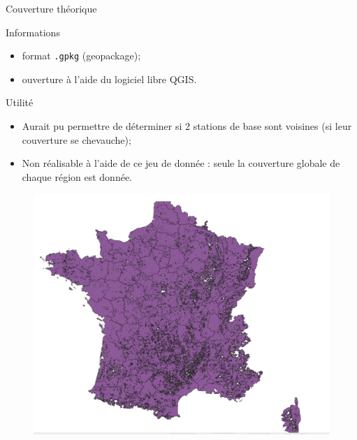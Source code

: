 \begin{frame}{Couverture théorique}
    \begin{block}{Informations}
        \begin{itemize}
            \item format \texttt{.gpkg} (geopackage);
            \item ouverture à l'aide du logiciel libre QGIS.
        \end{itemize}
    \end{block}

    \begin{block}{Utilité}
        \begin{itemize}
            \item Aurait pu permettre de déterminer si 2 stations de base sont voisines (si leur couverture se chevauche);
            \item Non réalisable à l'aide de ce jeu de donnée : seule la couverture globale de chaque région est donnée.
        \end{itemize}
    \end{block}
\end{frame}

\begin{frame}{}
    \begin{figure}
        \includegraphics[height=.8\textheight]{images/couverture_theorique_bouygues.png}
    \end{figure}
\end{frame}